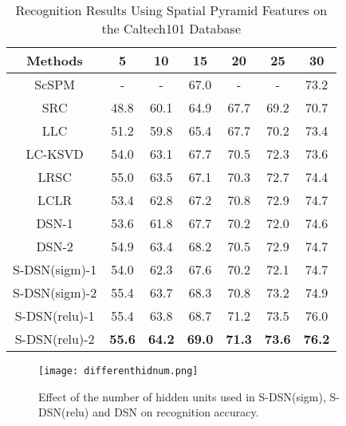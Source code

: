 \documentclass[letterpaper]{article}
\begin{document}
\begin{table}[t]
\small{\caption{Recognition Results Using Spatial Pyramid Features on the Caltech101 Database}}
\label{tab:resultCaltech101}
\begin{center}
\small{
\begin{tabular}{c|c|c|c|c|c|c}
\hline
Methods        &    5        &     10       &      15      &     20       &     25      &    30         \\
\hline
ScSPM         &    -        &     -        &      67.0    &     -        &     -       &    73.2       \\
SRC            &    48.8     &    60.1      &      64.9    &     67.7     &     69.2    &    70.7       \\
LLC            &    51.2     &    59.8      &      65.4    &     67.7     &     70.2    &    73.4       \\
LC-KSVD        &    54.0     &    63.1      &      67.7    &     70.5     &     72.3    &    73.6       \\
LRSC           &    55.0     &    63.5      &      67.1    &     70.3     &     72.7    &    74.4       \\
LCLR           &    53.4     &    62.8      &      67.2    &     70.8     &     72.9    &    74.7       \\
DSN-1          &    53.6     &    61.8      &      67.7    &     70.2     &     72.0    &    74.6       \\
DSN-2          &    54.9     &    63.4      &      68.2    &     70.5     &     72.9    &    74.7       \\
\hline
S-DSN(sigm)-1       &    54.0     &    62.3      &      67.6    &     70.2     &     72.1    &    74.7       \\
S-DSN(sigm)-2       &    55.4     &    63.7      &      68.3    &     70.8     &     73.2    &    74.9       \\
S-DSN(relu)-1       &    55.4     &    63.8      &      68.7    &     71.2     &     73.5    &    76.0       \\
S-DSN(relu)-2       &\textbf{55.6}&\textbf{64.2} &\textbf{69.0} &\textbf{71.3} &\textbf{73.6}& \textbf{76.2} \\
\hline
\end{tabular}}
\end{center}
\vskip -0.2in
\end{table}


\begin{figure}[ht]
\begin{center}
\centerline{\texttt{[image: differenthidnum.png]}}
\vskip -0.15in
\small{\caption{Effect of the number of hidden units used in S-DSN(sigm), S-DSN(relu) and DSN on recognition accuracy. }}
\label{fig:dhidnumc101}
\end{center}
\vskip -0.35in
\end{figure}
\end{document}
